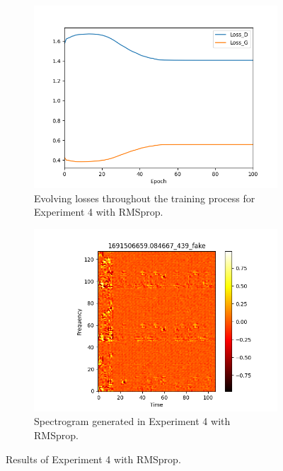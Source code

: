 \begin{figure}[!ht]
    \centering
    \begin{subfigure}{0.45\textwidth}
        \includegraphics[width=\textwidth]{figures/4.5-results/exp4_rms_loss.png}
        \caption{Evolving losses throughout the training process for Experiment 4 with RMSprop.}
        \label{fig:exp4_rms_loss}
    \end{subfigure}
    \begin{subfigure}{0.45\textwidth}
        \includegraphics[width=\textwidth]{figures/4.5-results/exp4_rms_spectrogram.png}
        \caption{Spectrogram generated in Experiment 4 with RMSprop.}
        \label{fig:exp4_rms_spectrogram}
    \end{subfigure}
    \caption{Results of Experiment 4 with RMSprop.}
    \label{fig:exp4_rms_results}
\end{figure}

